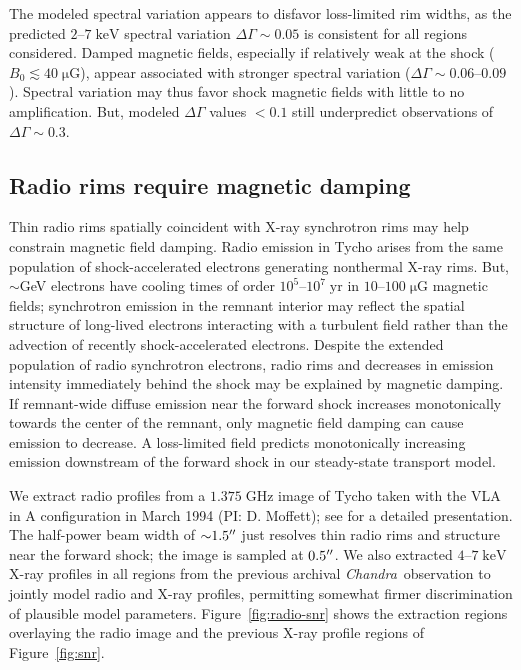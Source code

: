 \documentclass[iop, apj, numberedappendix]{emulateapj}
\newcommand*{\mt}{\mathrm}
\newcommand*{\unit}[1]{\;\mt{#1}}  %
\newcommand*{\abt}{\mathord{\sim}} %
\newcommand*{\Chandra}{\textit{Chandra}\ }
\newcommand*{\muG}{\unit{\mu G}}
\begin{document}
The modeled spectral variation appears to disfavor loss-limited rim widths, as
the predicted $2$--$7 \unit{keV}$ spectral variation $\Delta\Gamma \sim 0.05$
is consistent for all regions considered.  Damped magnetic fields, especially
if relatively weak at the shock ($B_0 \lesssim 40 \muG$), appear associated
with stronger spectral variation ($\Delta\Gamma \sim 0.06$--$0.09$).  Spectral
variation may thus favor shock magnetic fields with little to no amplification.
But, modeled $\Delta\Gamma$ values $< 0.1$ still underpredict observations of
$\Delta\Gamma \sim 0.3$.

\subsection{Radio rims require magnetic damping}

Thin radio rims spatially coincident with X-ray synchrotron rims may help
constrain magnetic field damping.  Radio emission in Tycho arises from the same
population of shock-accelerated electrons generating nonthermal X-ray rims.
But, $\abt$GeV electrons have cooling times of order $10^5$--$10^7 \unit{yr}$
in $10$--$100 \muG$ magnetic fields; synchrotron emission in the remnant
interior may reflect the spatial structure of long-lived electrons interacting
with a turbulent field rather than the advection of recently shock-accelerated
electrons.
Despite the extended population of radio synchrotron electrons, radio rims and
decreases in emission intensity immediately behind the shock may be explained
by magnetic damping.  If remnant-wide diffuse emission near the forward shock
increases monotonically towards the center of the remnant, only magnetic field
damping can cause emission to decrease.  A loss-limited field predicts
monotonically increasing emission downstream of the forward shock in our
steady-state transport model.

We extract radio profiles from a $1.375 \unit{GHz}$ image of Tycho taken
with the VLA in A configuration in March 1994 (PI: D. Moffett); see
\citet{reynoso1997} for a detailed presentation.
The half-power beam width of $\abt 1.5\arcsec$ just resolves thin radio rims
and structure near the forward shock; the image is sampled at $0.5\mbox{$^{\prime\prime}$}$.
We also extracted $4$--$7 \unit{keV}$ X-ray profiles in all regions from the
previous archival \Chandra observation to jointly model radio and X-ray
profiles, permitting somewhat firmer discrimination of plausible model
parameters.  Figure~\ref{fig:radio-snr} shows the extraction regions overlaying
the radio image and the previous X-ray profile regions of Figure~\ref{fig:snr}.
\end{document}
